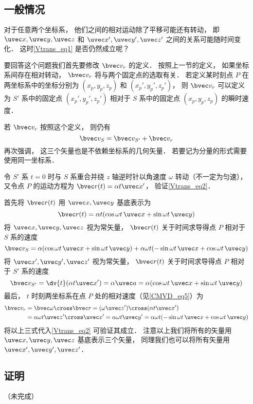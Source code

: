 \subsection{一般情况}
对于任意两个坐标系， 他们之间的相对运动除了平移可能还有转动， 即 $\uvec x, \uvec y, \uvec z$ 和 $\uvec x', \uvec y', \uvec z'$ 之间的关系可能随时间变化． 这时\autoref{Vtrans_eq1} 是否仍然成立呢？

要回答这个问题我们首先要修改 $\bvec v_r$ 的定义． 按照上一节的定义， 如果坐标系间存在相对转动， $\bvec v_r$ 将与两个固定点的选取有关． 若定义某时刻点 $P$ 在两坐标系中的坐标分别为 $(x_p, y_p, z_p)$ 和 $(x_p', y_p', z_p')$， 则 $\bvec v_r$ 可以定义为 $S'$ 系中的固定点 $(x_p', y_p', z_p')$ 相对于 $S$ 系中的固定点 $(x_p, y_p, z_p)$ 的瞬时速度．

若 $\bvec v_r$ 按照这个定义， 则仍有
\begin{equation}\label{Vtrans_eq2}
\bvec v_{S} = \bvec v_{S'} + \bvec v_r
\end{equation}
再次强调， 这三个矢量也是不依赖坐标系的几何矢量． 若要记为分量的形式需要使用同一坐标系．

\begin{example}{}\label{Vtrans_ex1}
令 $S'$ 系 $t = 0$ 时与 $S$ 系重合并绕 $z$ 轴逆时针以角速度 $\omega$ 转动（不一定为匀速）， 又令点 $P$ 的运动方程为 $\bvec r(t) = \alpha t \uvec x'$， 验证\autoref{Vtrans_eq2}．

首先将 $\bvec r(t)$ 用 $\uvec x, \uvec y$ 基底表示为
\begin{equation}
\bvec r(t) = \alpha t (\cos\omega t\, \uvec x + \sin\omega t\, \uvec y)
\end{equation}
将 $\uvec x, \uvec y, \uvec z$ 视为常矢量， $\bvec r(t)$ 关于时间求导得点 $P$ 相对于 $S$ 系的速度
\begin{equation}
\bvec v_S = \alpha (\cos\omega t \,\uvec x + \sin\omega t \,\uvec y)
+ \alpha\omega t (-\sin\omega t \,\uvec x + \cos\omega t \,\uvec y)
\end{equation}
将 $\uvec x', \uvec y', \uvec z'$ 视为常矢量， $\bvec r(t)$ 关于时间求导得点 $P$ 相对于 $S'$ 系的速度
\begin{equation}
\bvec v_{S'} = \dv{t} (\alpha t \uvec x') = \alpha \uvec a = \alpha (\cos\omega t\, \uvec x + \sin\omega t \,\uvec y)
\end{equation}
最后， $t$ 时刻两坐标系在点 $P$ 处的相对速度（见\autoref{CMVD_eq5}）为
\begin{equation}
\begin{aligned}
\bvec v_r &= \bvec\omega \cross \bvec r = (\omega \uvec z') \cross (\alpha t \uvec x') \\
&= \alpha\omega t \uvec z'\cross\uvec x' = \alpha\omega t \uvec y' = \alpha\omega t(-\sin \omega t \,\uvec x + \cos\omega t \,\uvec y)
\end{aligned}
\end{equation}
将以上三式代入\autoref{Vtrans_eq2} 可验证其成立． 注意以上我们将所有的矢量用 $\uvec x, \uvec y, \uvec z$ 基底表示三个矢量， 同理我们也可以将所有矢量用 $\uvec x', \uvec y', \uvec z'$．
\end{example}

\subsection{证明}
（未完成）%
